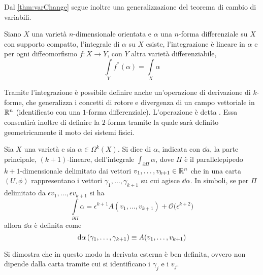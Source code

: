 Dal \autoref{thm:varChange} segue inoltre una generalizzazione del teorema di cambio di variabili.
\begin{theorem}
  Siano $X$ una varietà $n$-dimensionale orientata e $\alpha$ una $n$-forma differenziale su $X$ con supporto compatto, l'integrale di $\alpha$ su $X$ esiste, l'integrazione è lineare in $\alpha$ e per ogni diffeomorfismo $f:X\to Y$, con $Y$ altra varietà differenziabile,
  \begin{equation*}
  \int\limits_Y f^*(\alpha) = \int\limits_X \alpha
  \end{equation*} 
\end{theorem}

Tramite l'integrazione è possibile definire anche un'operazione di derivazione di $k$-forme, che generalizza i concetti di rotore e divergenza di un campo vettoriale in $\mathbb{R}^{n}$ (identificato con una $1$-forma differenziale). L'operazione è detta . Essa consentirà inoltre di definire la $2$-forma tramite la quale sarà definito geometricamente il moto dei sistemi fisici. 
\begin{definition}
  Sia $X$ una varietà e sia $\alpha \in \Omega^k(X)$. Si dice  di $\alpha$, indicata con $\dd{a}$, la parte principale, $(k+1)$-lineare, dell'integrale $\int_{\partial \Pi} \alpha$, dove $\Pi$ è il parallelepipedo $k+1$-dimensionale delimitato dai vettori $v_1, \ldots, v_{k+1} \in \mathbb{R}^{n}$ che in una carta $(U, \phi)$ rappresentano i vettori $\gamma_1, \ldots, \gamma_{k+1}$ su cui agisce $\dd\alpha$. In simboli, se per $\Pi$ delimitato da $\epsilon v_1, \ldots, \epsilon v_{k+1}$ si ha \begin{equation*}
    \int\limits_{\partial \Pi} \alpha = \epsilon^{k+1} A(v_1, \ldots, v_{k+1}) + \mathcal{O}\big(\epsilon^{k+2}\big)
  \end{equation*}
  allora $\dd\alpha$ è definita come \begin{equation*}
  \dd{\alpha}(\gamma_1, \ldots, \gamma_{k+1}) \equiv A(v_1, \ldots, v_{k+1})
  \end{equation*} 
\end{definition}
\begin{remark}
  Si dimostra che in questo modo la derivata esterna è ben definita, ovvero non dipende dalla carta tramite cui si identificano i $\gamma_j$ e i $v_j$.
\end{remark}

